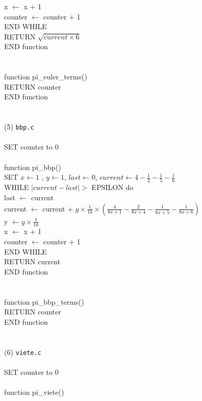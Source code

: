 \documentclass[12pt]{article}
\begin{document}
\indent \indent x $\leftarrow$ x + 1 \\
\indent \indent counter $\leftarrow$ counter + 1 \\
\indent END WHILE \\
\indent RETURN $\sqrt{current \times 6}$ \\
END function \\
\\
\\
function pi\_euler\_terms() \\
\indent RETURN counter \\
END function \\
\\
\\
(5) \texttt{bbp.c} \\
\\
SET counter to 0 \\
\\
function pi\_bbp() \\
\indent SET $x \leftarrow 1$ , $y \leftarrow 1$, $last \leftarrow 0$, $current \leftarrow 4 - \frac{1}{2} - \frac{1}{5} - \frac{1}{6}$ \\
\indent WHILE $| current - last | >$ EPSILON do \\
\indent \indent last $\leftarrow$ current \\
\indent \indent current $\leftarrow$ current + $y \times \frac{1}{16} \times (\frac{4}{8x + 1} - \frac{2}{8x + 4} - \frac{1}{8x + 5}- \frac{1}{8x + 6})$ \\
\indent \indent y $\leftarrow y \times \frac{1}{16}$ \\
\indent \indent x $\leftarrow$ x + 1 \\
\indent \indent counter $\leftarrow$ counter + 1 \\
\indent END WHILE \\
\indent RETURN current \\
END function \\
\\
\\
function pi\_bbp\_terms() \\
\indent RETURN counter \\
END function \\
\\
\\
(6) \texttt{viete.c} \\
\\
SET counter to 0 \\
\\
function pi\_viete() \\
\end{document}
